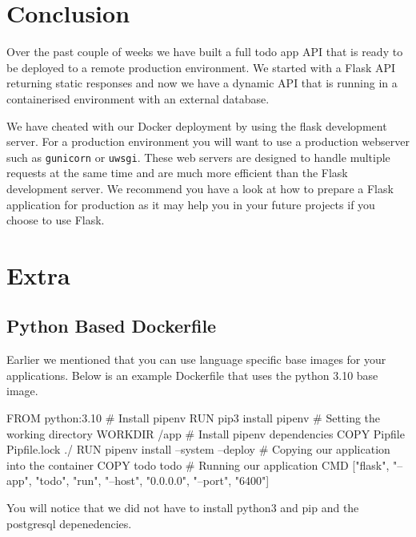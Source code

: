 \documentclass{csse4400}
\begin{document}

\section{Conclusion}

Over the past couple of weeks we have built a full todo app API that is ready to be deployed to a remote production environment.
We started with a Flask API returning static responses and now we have a dynamic API that is running in a containerised environment with an external database.

We have cheated with our Docker deployment by using the flask development server.
For a production environment you will want to use a production webserver such as \texttt{gunicorn} or \texttt{uwsgi}.
These web servers are designed to handle multiple requests at the same time and are much more efficient than the Flask development server.
We recommend you have a look at how to prepare a Flask application for production as it may help you in your future projects if you choose to use Flask.

\section{Extra}

\subsection{Python Based Dockerfile}

Earlier we mentioned that you can use language specific base images for your applications. Below is an example Dockerfile that uses the python 3.10 base image.

\begin{code}[language=docker,numbers=none]{}
FROM python:3.10
# Install pipenv
RUN pip3 install pipenv
# Setting the working directory
WORKDIR /app
# Install pipenv dependencies
COPY Pipfile Pipfile.lock ./
RUN pipenv install --system --deploy
# Copying our application into the container
COPY todo todo
# Running our application
CMD ["flask", "--app", "todo", "run", "--host", "0.0.0.0", "--port", "6400"]
\end{code}

You will notice that we did not have to install python3 and pip and the postgresql depenedencies.

%
%
\end{document}
